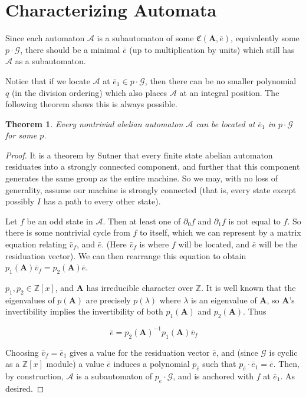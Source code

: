 \documentclass{article}
\newcommand{\A}{\mathcal{A}}
\newcommand{\G}{\mathcal{G}}
\newcommand{\C}{\mathfrak{C}(\Am,\e)}
\newcommand{\Z}{\mathbb{Z}}
\newcommand{\2}{\textbf{2}}
\newcommand{\Am}{\textbf{A}}
\newcommand{\del}{\partial}
\newcommand{\vv}{\bar{v}}
\newcommand{\e}{\bar{e}}
\newtheorem{thm}{Theorem}
\theoremstyle{definition}
\begin{document}
\section{Characterizing Automata}
Since each automaton $\A$ is a subautomaton of some $\C$,
equivalently some $p \cdot \G$, there should be a minimal $\e$ 
(up to multiplication by units) which still has $\A$ as a subautomaton. 

Notice that if we locate $\A$ at $\e_1 \in p \cdot \G$, 
then there can be no smaller polynomial $q$ (in the division ordering)
which also places $\A$ at an integral position. The following theorem 
shows this is always possible.

\begin{thm}
  Every nontrivial abelian automaton $\A$ can be 
  located at $\e_1$ in $p \cdot \G$ for some $p$.
\end{thm}

\begin{proof}
  It is a theorem by Sutner \cite{Sutner18:abelian_automata} that every 
  finite state abelian automaton residuates into a strongly connected component, 
  and further that this component generates the same group as the entire 
  machine. So we may, with no loss of generality, assume our machine is 
  strongly connected (that is, every state except possibly $I$ has a path to
  every other state).

  Let $f$ be an odd state in $\A$. Then at least one of $\del_0 f$ and 
  $\del_1 f$ is not equal to $f$. So there is some nontrivial cycle
  from $f$ to itself, which we can represent by a matrix equation 
  relating $\vv_f$, and $\e$. (Here $\vv_f$ is where $f$ will be located, 
  and $\e$ will be the residuation vector). 
  We can then rearrange this equation to obtain 
  $p_1(\Am)\vv_f = p_2(\Am)\e$.

  $p_1, p_2 \in \Z[x]$, and $\Am$ has irreducible character over $\Z$.
  It is well known that the eigenvalues of $p(\Am)$ are precisely $p(\lambda)$
  where $\lambda$ is an eigenvalue of $\Am$, so $\Am$'s invertibility implies
  the invertibility of both $p_1(\Am)$ and $p_2(\Am)$. Thus

  \[ \e = p_2(\Am)^{-1}p_1(\Am)\vv_f \]

  Choosing $\vv_f = \e_1$ gives a value for the residuation vector $\e$,
  and (since $\G$ is cyclic as a $\Z[x]$ module) a value $\e$ induces a 
  polynomial $p_{\e}$ such that $p_{\e} \cdot \e_1 = \e$. 
  Then, by construction, $\A$ is a subautomaton of $p_e \cdot \G$, and is 
  anchored with $f$ at $\e_1$. As desired.
\end{proof}
\end{document}
